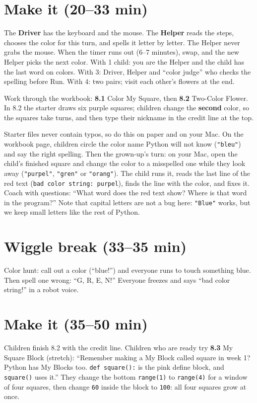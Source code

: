 \section{Make it (20--33 min)}
\begin{pairroles}
The \textbf{Driver} has the keyboard and the mouse. The \textbf{Helper} reads the steps, chooses the color for this turn, and spells it letter by letter. The Helper never grabs the mouse. When the timer runs out (6--7 minutes), swap, and the new Helper picks the next color. With 1 child: you are the Helper and the child has the last word on colors. With 3: Driver, Helper and \enquote{color judge} who checks the spelling before Run. With 4: two pairs; visit each other's flowers at the end.
\end{pairroles}

Work through the workbook: \textbf{8.1} Color My Square, then \textbf{8.2} Two-Color Flower. In 8.2 the starter draws six purple squares; children change the \textbf{second} color, so the squares take turns, and then type their nickname in the credit line at the top.

\begin{bughunt}
Starter files never contain typos, so do this on paper and on your Mac. On the workbook page, children circle the color name Python will not know (\texttt{"bleu"}) and say the right spelling. Then the grown-up's turn: on your Mac, open the child's finished square and change the color to a misspelled one while they look away (\texttt{"purpel"}, \texttt{"gren"} or \texttt{"orang"}). The child runs it, reads the last line of the red text (\texttt{bad color string: purpel}), finds the line with the color, and fixes it. Coach with questions: \enquote{What word does the red text show? Where is that word in the program?} Note that capital letters are not a bug here: \texttt{"Blue"} works, but we keep small letters like the rest of Python.
\end{bughunt}

\section{Wiggle break (33--35 min)}
Color hunt: call out a color (\enquote{blue!}) and everyone runs to touch something blue. Then spell one wrong: \enquote{G, R, E, N!} Everyone freezes and says \enquote{bad color string!} in a robot voice.

\section{Make it (35--50 min)}
Children finish 8.2 with the credit line. Children who are ready try \textbf{8.3} My Square Block (stretch): \enquote{Remember making a My Block called square in week 1? Python has My Blocks too. \texttt{def square():} is the pink define block, and \texttt{square()} uses it.} They change the bottom \texttt{range(1)} to \texttt{range(4)} for a window of four squares, then change \texttt{60} inside the block to \texttt{100}: all four squares grow at once.

